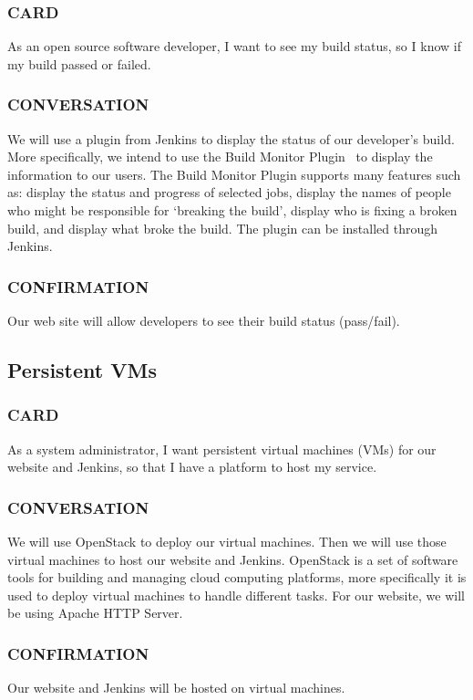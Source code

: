 \documentclass[10pt,letterpaper,onecolumn,journal]{IEEEtran}
\begin{document}
\subsubsection{CARD}
As an open source software developer, I want to see my build status, so I know if my build passed or failed.
\subsubsection{CONVERSATION}
We will use a plugin from Jenkins to display the status of our developer's build. More specifically, we intend to use the Build Monitor Plugin~\cite{buildmonitor} to display the information to our users. The Build Monitor Plugin supports many features such as: display the status and progress of selected jobs, display the names of people who might be responsible for `breaking the build', display who is fixing a broken build, and display what broke the build. The plugin can be installed through Jenkins.
\subsubsection{CONFIRMATION}
Our web site will allow developers to see their build status (pass/fail).

\subsection{Persistent VMs}
\subsubsection{CARD}
As a system administrator, I want persistent virtual machines (VMs) for our website and Jenkins, so that I have a platform to host my service.
\subsubsection{CONVERSATION}
We will use OpenStack to deploy our virtual machines. Then we will use those virtual machines to host our website and Jenkins. OpenStack is a set of software tools for building and managing cloud computing platforms, more specifically it is used to deploy virtual machines to handle different tasks. For our website, we will be using Apache HTTP Server.
\subsubsection{CONFIRMATION}
Our website and Jenkins will be hosted on virtual machines.
\end{document}
